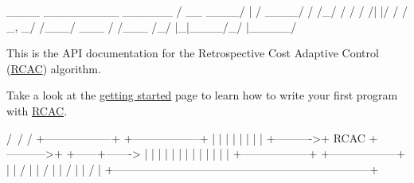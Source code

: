 \begin{DoxyVerb}    ____  _________   ______
   / __ \/ ____/   | / ____/
  / /_/ / /   / /| |/ /     
 / _, _/ /___/ ___ / /___   
/_/ |_|\____/_/  |_\____/   \end{DoxyVerb}
 This is the A\+PI documentation for the Retrospective Cost Adaptive Control (\hyperlink{class_r_c_a_c}{R\+C\+AC}) algorithm.

Take a look at the \hyperlink{_getting_started}{getting started} page to learn how to write your first program with \hyperlink{class_r_c_a_c}{R\+C\+AC}. \begin{DoxyVerb}                          /\
                         /
                        /
            +------------------+            +------------------+
            |                  |            |                  |
            |                  |            |                  |
+---------->+       RCAC       +----------->+                  +------+------->
|           |                  |            |                  |      |
|           |                  |            |                  |      |
|           +------------------+            +------------------+      |
|                /                                                    |
|               /                                                     |
|              /                                                      |
|             /                                                       |
+---------------------------------------------------------------------+
\end{DoxyVerb}
 